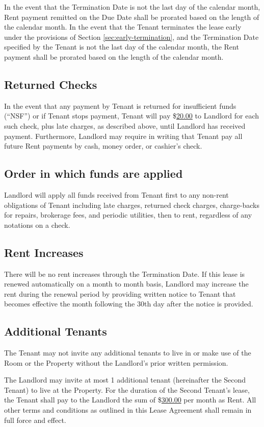 \documentclass{amsart}
\begin{document}
In the event that the Termination Date is not the last day of the calendar
month, Rent payment remitted on the Due Date shall be prorated based on the
length of the calendar month. In the event that the Tenant terminates the lease
early under the provisions of Section \ref{sec:early-termination}, and the
Termination Date specified by the Tenant is not the last day of the calendar
month, the Rent payment shall be prorated based on the length of the calendar
month.
\subsection{Returned Checks}
In the event that any payment by Tenant is returned for insufficient funds
(``NSF'') or if Tenant stops payment, Tenant will pay \$\underline{20.00} to
Landlord for each such check, plus late charges, as described above, until
Landlord has received payment. Furthermore, Landlord may require in writing that
Tenant pay all future Rent payments by cash, money order, or cashier's check.
\subsection{Order in which funds are applied}
Landlord will apply all funds received from Tenant first to any non-rent
obligations of Tenant including late charges, returned check charges,
charge-backs for repairs, brokerage fees, and periodic utilities, then to rent,
regardless of any notations on a check.
\subsection{Rent Increases}
There will be no rent increases through the Termination Date. If this lease is
renewed automatically on a month to month basis, Landlord may increase the rent
during the renewal period by providing written notice to Tenant that becomes
effective the month following the 30th day after the notice is provided.
\subsection{Additional Tenants}
The Tenant may not invite any additional tenants to live in or make use of the
Room or the Property without the Landlord's prior written permission.

The Landlord may invite at most 1 additional tenant (hereinafter the Second
Tenant) to live at the Property. For the duration of the Second Tenant's lease,
the Tenant shall pay to the Landlord the sum of \$\underline{300.00} per month
as Rent. All other terms and conditions as outlined in this Lease Agreement
shall remain in full force and effect.
\end{document}
